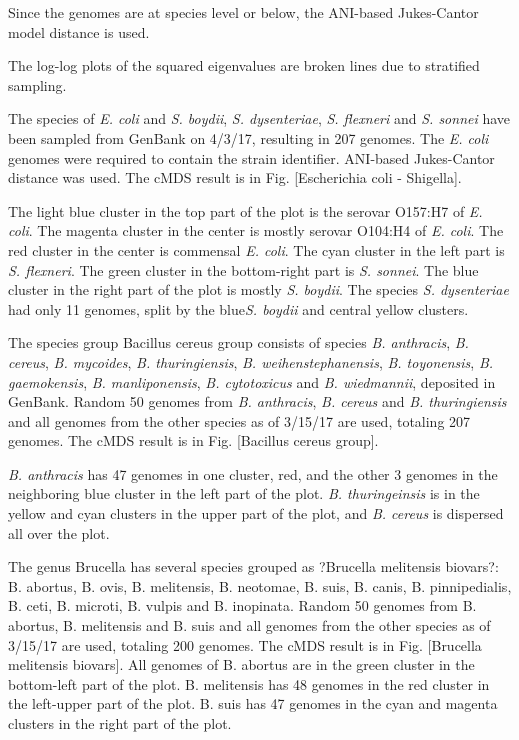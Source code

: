 \documentclass[10pt,a4paper]{article}
\begin{document}
Since the genomes are at species level or below, the ANI-based Jukes-Cantor model distance is used.

The log-log plots of the squared eigenvalues are broken lines due to stratified sampling.



The species of {\it E. coli} and {\it S. boydii}, {\it S. dysenteriae}, {\it S. flexneri} and {\it S. sonnei} have been sampled from GenBank on 4/3/17, resulting in 207 genomes.
The {\it E. coli} genomes were required to contain the strain identifier.
ANI-based Jukes-Cantor distance was used.
The cMDS result is in Fig. [Escherichia coli - Shigella].

The light blue cluster in the top part of the plot is the serovar O157:H7 of {\it E. coli}.
The magenta cluster in the center is mostly serovar O104:H4 of {\it E. coli}.
The red cluster in the center is commensal {\it E. coli}.
The cyan cluster in the left part is {\it S. flexneri}.
The green cluster in the bottom-right part is {\it S. sonnei}.
The blue cluster in the right part of the plot is mostly {\it S. boydii}.
The species {\it S. dysenteriae} had only 11 genomes, split by the blue{\it  S. boydii} and central yellow clusters.



The species group Bacillus cereus group consists of species
{\it B. anthracis},
{\it B. cereus},
{\it B. mycoides},
{\it B. thuringiensis},
{\it B. weihenstephanensis},
{\it B. toyonensis},
{\it B. gaemokensis},
{\it B. manliponensis},
{\it B. cytotoxicus}
and {\it B. wiedmannii},
deposited in GenBank.
Random 50 genomes from {\it B. anthracis}, {\it B. cereus} and {\it B. thuringiensis}
and all genomes from the other species as of 3/15/17 are used, totaling 207 genomes.
The cMDS result is in Fig. [Bacillus cereus group].

{\it B. anthracis} has 47 genomes in one cluster, red, and the other 3 genomes in the neighboring blue cluster in the left part of the plot.
{\it B. thuringeinsis} is in the yellow and cyan clusters in the upper part of the plot,
and {\it B. cereus} is dispersed all over the plot.



The genus Brucella has several species grouped as ?Brucella melitensis biovars?: B. abortus, B. ovis, B. melitensis, B. neotomae, B. suis, B. canis, B. pinnipedialis, B. ceti, B. microti, B. vulpis and B. inopinata.
Random 50 genomes from B. abortus, B. melitensis and B. suis and all genomes from the other species as of 3/15/17 are used, totaling 200 genomes. The cMDS result is in Fig. [Brucella melitensis biovars].
All genomes of B. abortus are in the green cluster in the bottom-left part of the plot. B. melitensis has 48 genomes in the red cluster in the left-upper part of the plot. B. suis has 47 genomes in the cyan and magenta clusters in the right part of the plot.
\end{document}

